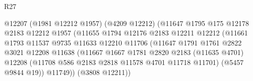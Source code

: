 \begin{lexlean}{R27}
\begin{coremodule}
                                      @12207
                                        (@1981 @12212 @1957)
                                        (@4209 @12212)
                                        (@11647
                                          @1795
                                          @175
                                          @12178
                                          @2183
                                          @12212
                                          @1957
                                          (@11655
                                            @1794
                                            @12176
                                            @2183
                                            @12211
                                            @12212
                                            (@11661
                                              @1793
                                              @11537
                                              @9735
                                              @11633
                                              @12210
                                              @11706
                                              (@11647
                                                @1791
                                                @1761
                                                @2822
                                                @3021
                                                @12208
                                                @11638
                                                (@11667
                                                  @1667
                                                  @1781
                                                  @2820
                                                  @2183
                                                  (@11635 @4701)
                                                  @12208
                                                  (@11708
                                                    @586
                                                    @2183
                                                    @2818
                                                    @11578
                                                    @4701
                                                    @11718
                                                    @11701)
                                                  (@5457 @9844 @19))
                                                @11749))
                                            (@3808 @12211))

\end{coremodule}
\end{lexlean}
